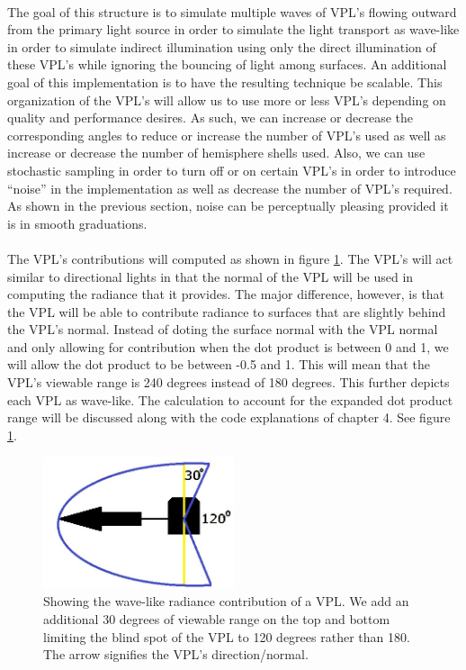 \paragraph{}
The goal of this structure is to simulate multiple waves of VPL's flowing outward from the primary light source in order to simulate the light transport as wave-like in order to simulate indirect illumination using only the direct illumination of these VPL's while ignoring the bouncing of light among surfaces.  An additional goal of this implementation is to have the resulting technique be scalable.  This organization of the VPL's will allow us to use more or less VPL's depending on quality and performance desires.  As such, we can increase or decrease the corresponding angles to reduce or increase the number of VPL's used as well as increase or decrease the number of hemisphere shells used.  Also, we can use stochastic sampling in order to turn off or on certain VPL's in order to introduce “noise” in the implementation as well as decrease the number of VPL's required.  As shown in the previous section, noise can be perceptually pleasing provided it is in smooth graduations.

\paragraph{}
The VPL's contributions will computed as shown in figure \ref{fig:3.6}.  The VPL's will act similar to directional lights in that the normal of the VPL will be used in computing the radiance that it provides.  The major difference, however, is that the VPL will be able to contribute radiance to surfaces that are slightly behind the VPL's normal.  Instead of doting the surface normal with the VPL normal and only allowing for contribution when the dot product is between 0 and 1, we will allow the dot product to be between -0.5 and 1.  This will mean that the VPL's viewable range is 240 degrees instead of 180 degrees.  This further depicts each VPL as wave-like.  The calculation to account for the expanded dot product range will be discussed along with the code explanations of chapter 4.  See figure \ref{fig:3.6}.

\begin{figure}[h!]
  \centering
    \includegraphics[width=0.5\textwidth]{Figure36.jpg}
  \caption{Showing the wave-like radiance contribution of a VPL. We add an additional 30 degrees of viewable range on the top and bottom limiting the blind spot of the VPL to 120 degrees rather than 180. The arrow signifies the VPL's direction/normal.}
	\label{fig:3.6}
\end{figure}

